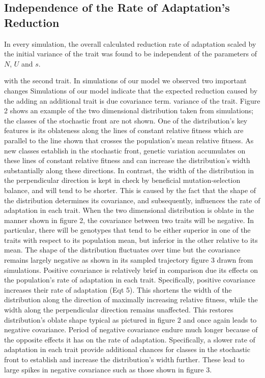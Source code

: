 \documentclass[11pt,twocolumn]{article}
\begin{document}
\subsection{Independence of the Rate of Adaptation's Reduction}
In every simulation, the overall calculated reduction rate of adaptation scaled by the initial variance of the trait was found to be independent of the parameters of $N$, $U$ and $s$. 

 with the second trait. In simulations of our model we observed two important changes Simulations of our model indicate that the expected reduction caused by the adding an additional trait is due  covariance term. variance of the trait. Figure 2 shows an example of the two dimensional distribution taken from simulations; the classes of the stochastic front are not shown. One of the distribution's key features is its oblateness along the lines of constant relative fitness which are parallel to the line shown that crosses the population's mean relative fitness.  As new classes establish in the stochastic front, genetic variation accumulates on these lines of constant relative fitness and can increase the distribution's width substantially along these directions. In contrast, the width of the distribution in the perpendicular direction is kept in check by beneficial mutation-selection balance, and will tend to be shorter. This is caused by the fact that the shape of the distribution determines its covariance, and subsequently, influences the rate of adaptation in each trait. When the two dimensional distribution is oblate in the manner shown in figure 2, the covariance between two traits will be negative. In particular, there will be genotypes that tend to be either superior in one of the traits with respect to its population mean, but inferior in the other relative to its mean. The shape of the distribution fluctuates over time but the covariance remains largely negative as shown in its sampled trajectory figure 3 drawn from simulations. Positive covariance is relatively brief in comparison due its effects on the population's rate of adaptation in each trait. Specifically, positive covariance increases their rate of adaptation (Eqt 5). This shortens the width of the distribution along the direction of maximally increasing relative fitness, while the width along the perpendicular direction remains unaffected.  This restores distribution's oblate shape typical as pictured in figure 2 and once again leads to negative covariance.  Period of negative covariance endure much longer because of the opposite effects it has on the rate of adaptation. Specifically, a slower rate of adaptation in each trait provide additional chances for classes in the stochastic front to establish and increase the distribution's width further.  These lead to large spikes in negative covariance such as those shown in figure 3. 
% 
% 
% 
% 
\end{document}

